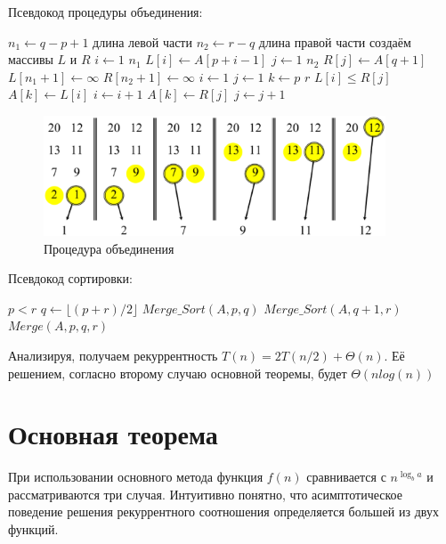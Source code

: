 \documentclass[a4paper,11pt]{article}
\begin{document}
Псевдокод процедуры объединения:
\begin{codebox}
  \li $n_1 \gets q - p + 1$ \Comment длина левой части
  \li $n_2 \gets r - q$ \Comment длина правой части
  \li \Comment создаём массивы $L$ и $R$
  \li \For $i \gets 1 $ \To $n_1$
  \li   \Do $L[i] \gets A[p + i - 1]$
      \End
  \li \For $j \gets 1 $ \To $n_2$
  \li   \Do $R[j] \gets A[q + 1]$
      \End
  \li $L[n_1 + 1] \gets \infty$
  \li $R[n_2 + 1] \gets \infty$
  \li $i \gets 1$
  \li $j \gets 1$
  \li \For $k \gets p $ \To $r$
  \li   \Do \If $L[i] \leqslant R[j]$
  \li          \Then $A[k] \gets L[i]$
  \li                $i \gets i + 1$
  \li          \Else $A[k] \gets R[j]$
  \li                $j \gets j + 1$
             \End
      \End
\end{codebox}

\begin{figure}[ht]
  \centering
  \includegraphics[width=4in]{lecture3/merge.eps}
  \caption{Процедура объединения}
  \label{fig:merge}
\end{figure}

Псевдокод сортировки:
\begin{codebox}
  \li \If $p < r$
  \li \Then $q \gets \lfloor (p+r)/2 \rfloor$
  \li       $Merge\_Sort(A, p, q)$
  \li       $Merge\_Sort(A, q+1, r)$
  \li       $Merge(A, p, q, r)$
      \End
\end{codebox}

Анализируя, получаем рекуррентность $T(n) = 2T(n/2) + \Theta(n)$. Её решением,
согласно второму случаю основной теоремы, будет $\Theta(n log(n))$

\section{Основная теорема}
При использовании основного метода функция $f(n)$ сравнивается с $n^{\log_b a}$
и рассматриваются три случая. Интуитивно понятно, что асимптотическое поведение
решения рекуррентного соотношения определяется большей из двух функций.
\end{document}
